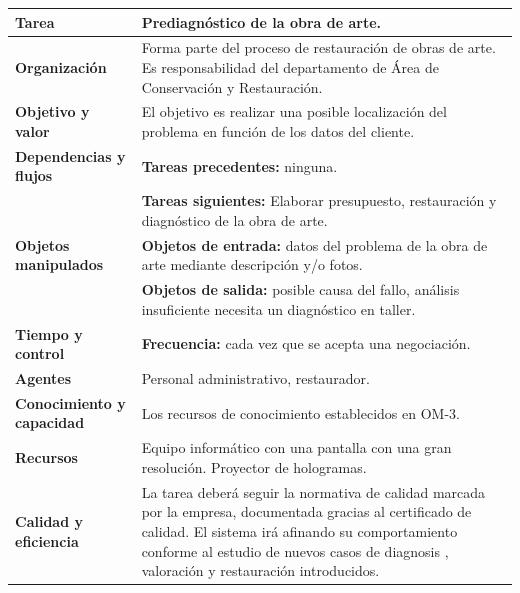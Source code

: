 \documentclass[a4paper,11pt]{article}
\begin{document}
			\begin{center}
				\begin{tabular}{| l | p{6.5cm} |}
					\hline
					\textbf{Tarea} & Prediagnóstico de la obra de arte.\\
					\hline
					\textbf{Organización} & Forma parte del proceso de restauración de obras de
					arte. Es responsabilidad del departamento de Área de Conservación y
					Restauración.\\
					\hline
					\textbf{Objetivo y valor} & El objetivo es realizar una posible
					localización del problema en función de los datos del cliente.\\
					\hline
					\textbf{Dependencias y flujos} & \textbf{Tareas precedentes:} ninguna.\\
					& \textbf{Tareas siguientes:} Elaborar presupuesto, restauración y
					diagnóstico de la obra de arte.\\
					\hline
					\textbf{Objetos manipulados} & \textbf{Objetos de entrada:} datos del
					problema de la obra de arte mediante descripción y/o fotos.\\
					& \textbf{Objetos de salida:} posible causa del fallo, análisis
					insuficiente necesita un diagnóstico en taller.\\
					\hline
					\textbf{Tiempo y control} & \textbf{Frecuencia:} cada vez que se acepta una
					negociación.\\
					\hline
					\textbf{Agentes} & Personal administrativo, restaurador.\\
					\hline
					\textbf{Conocimiento y capacidad} & Los recursos de conocimiento
					establecidos en OM-3.\\
					\hline
					\textbf{Recursos} & Equipo informático con una pantalla con una gran
					resolución. Proyector de hologramas.\\
					\hline
					\textbf{Calidad y eficiencia} & La tarea deberá seguir la normativa de
					calidad marcada por la empresa, documentada gracias al certificado de calidad. El sistema irá afinando su comportamiento conforme al estudio de nuevos casos de diagnosis , valoración y restauración introducidos.\\
					\hline
				\end{tabular}
			\end{center}
			\newpage
\end{document}
